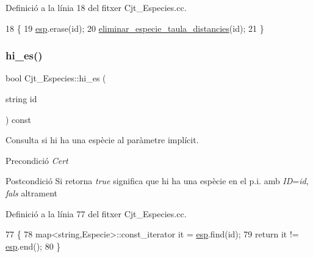 Definició a la línia 18 del fitxer Cjt\+\_\+\+Especies.\+cc.


\begin{DoxyCode}
18                                              \{
19     \hyperlink{class_cjt___especies_aa232ab8543b78ea6d8ecaa1e5f9ccef5}{esp}.erase(\textcolor{keywordtype}{id});
20     \hyperlink{class_cjt___especies_aa30fcd79ec745178533800095f0e9e22}{eliminar\_especie\_taula\_distancies}(\textcolor{keywordtype}{id});
21 \}
\end{DoxyCode}
\mbox{\label{class_cjt___especies_a35ea93ace40167f444bade9e8362c7e4}} 
\subsubsection{\texorpdfstring{hi\+\_\+es()}{hi\_es()}}
{\footnotesize\ttfamily bool Cjt\+\_\+\+Especies\+::hi\+\_\+es (\begin{DoxyParamCaption}\item[{string}]{id }\end{DoxyParamCaption}) const}



Consulta si hi ha una espècie al paràmetre implícit. 

\begin{DoxyPrecond}{Precondició}
{\itshape Cert} 
\end{DoxyPrecond}
\begin{DoxyPostcond}{Postcondició}
Si retorna {\itshape true} significa que hi ha una espècie en el p.\+i. amb {\itshape ID}={\itshape id}, {\itshape fals} altrament 
\end{DoxyPostcond}


Definició a la línia 77 del fitxer Cjt\+\_\+\+Especies.\+cc.


\begin{DoxyCode}
77                                         \{
78     map<string,Especie>::const\_iterator it = \hyperlink{class_cjt___especies_aa232ab8543b78ea6d8ecaa1e5f9ccef5}{esp}.find(\textcolor{keywordtype}{id});
79     \textcolor{keywordflow}{return} it != \hyperlink{class_cjt___especies_aa232ab8543b78ea6d8ecaa1e5f9ccef5}{esp}.end();
80 \}
\end{DoxyCode}
\mbox{\label{class_cjt___especies_a5f4595e63cfede3377383b4fb1c35681}} 
